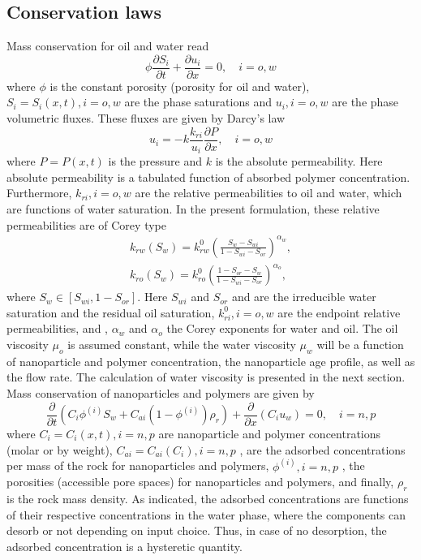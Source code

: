 \subsection{Conservation laws}
Mass conservation for oil and water read
\begin{equation} \label{eq:massConservation} %
    \phi\frac{\partial S_i}{\partial t}+\frac{\partial u_i}{\partial x} = 0,\quad i = o, w
\end{equation}
where $\phi$ is the constant porosity (porosity for oil and water), $S_i=S_i(x,t), i = o,w$ are the phase saturations and $u_i, i=o,w$ are the phase volumetric fluxes. These fluxes are given by Darcy’s law
\begin{equation} \label{eq:fluxes} %
    u_i= -k\frac{k_{ri}}{u_i}\frac{\partial P}{\partial x},\quad i = o, w
\end{equation}
where $P=P(x,t)$  is the pressure and $k$ is the absolute permeability. Here absolute permeability is a tabulated function of absorbed polymer concentration. Furthermore, $k_{ri}, i = o, w$ are the relative permeabilities to oil and water, which are functions of water saturation. In the present formulation, these relative permeabilities are of Corey type
\begin{subequations}
\begin{eqnarray}
 k_{rw}(S_w)=k^0_{rw}(\frac{S_w-S_{wi}}{1-S_{wi}-S_{or}})^{\alpha_w} ,\\
    k_{ro}(S_w)=k^0_{ro}(\frac{1-S_{or}-S_{w}}{1-S_{wi}-S_{or}})^{\alpha_o} ,
\end{eqnarray}
\end{subequations}
where $S_w\in [S_{wi}, 1-S_{or}]$. Here $S_{wi}$ and $S_{or}$ and are the irreducible water saturation and the residual oil saturation, $k^0_{ri}, i=o,w$  are the endpoint relative permeabilities, and , $\alpha_w$ and $\alpha_o$  the Corey exponents for water and oil. The oil viscosity $\mu_o$ is assumed constant, while the water viscosity $\mu_w$ will be a function of nanoparticle and polymer concentration, the nanoparticle age profile, as well as the flow rate. The calculation of water viscosity is presented in the next section.
Mass conservation of nanoparticles and polymers are given by 
\begin{equation} \label{eq:massConsNPpol} %
    \frac{\partial}{\partial t}(C_i\phi^{(i)}S_w + C_{ai}(1-\phi^{(i)})\rho_r)+ \frac{\partial}{\partial x}(C_i u_w) = 0, \quad i = n, p
\end{equation}
where $C_i=C_i(x,t), i=n,p$ are nanoparticle and polymer concentrations (molar or by weight), $C_{ai}=C_{ai}(C_i), i=n,p$ , are the adsorbed concentrations per mass of the rock for nanoparticles and polymers, $\phi^{(i)}, i=n,p$ , the porosities (accessible pore spaces) for nanoparticles and polymers, and finally, $\rho_r$ is the rock mass density. As indicated, the adsorbed concentrations are functions of their respective concentrations in the water phase, where the components can desorb or not depending on input choice. Thus, in case of no desorption, the adsorbed concentration is a hysteretic quantity.   
